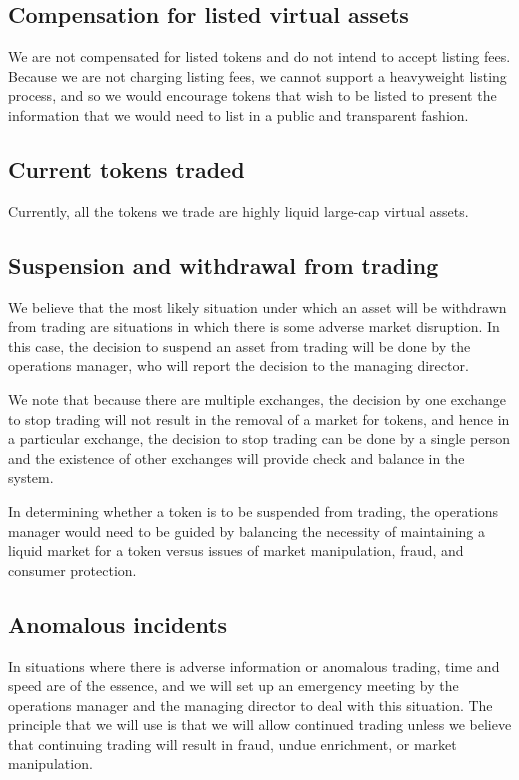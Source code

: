 \subsection{Compensation for listed virtual assets}

We are not compensated for listed tokens and do not intend to accept
listing fees.  Because we are not charging listing fees, we cannot
support a heavyweight listing process, and so we would encourage
tokens that wish to be listed to present the information that we would
need to list in a public and transparent fashion.

\subsection{Current tokens traded}
Currently, all the tokens we trade are highly liquid large-cap
virtual assets.


\subsection{Suspension and withdrawal from trading}
We believe that the most likely situation under which an asset will be
withdrawn from trading are situations in which there is some adverse
market disruption.  In this case, the decision to suspend an asset from
trading will be done by the operations manager, who will report the
decision to the managing director.

We note that because there are multiple exchanges, the decision by one
exchange to stop trading will not result in the removal of a market
for tokens, and hence in a particular exchange, the decision to stop
trading can be done by a single person and the existence of other
exchanges will provide check and balance in the system.

In determining whether a token is to be suspended from trading, the
operations manager would need to be guided by balancing the necessity
of maintaining a liquid market for a token versus issues of market
manipulation, fraud, and consumer protection.


\subsection{Anomalous incidents}
In situations where there is adverse information or anomalous trading,
time and speed are of the essence, and we will set up an emergency
meeting by the operations manager and the managing director to deal
with this situation.  The principle that we will use is that we will
allow continued trading unless we believe that continuing trading will
result in fraud, undue enrichment, or market manipulation.

